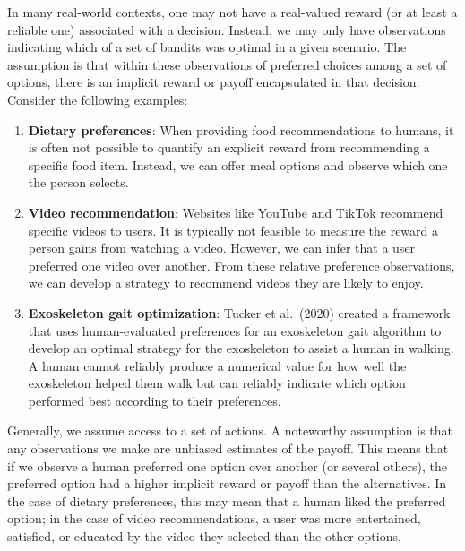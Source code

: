 \documentclass[
  letterpaper,
  numbers=noenddot,
  DIV=11]{scrreprt}
\theoremstyle{plain}
\theoremstyle{definition}
\theoremstyle{remark}
\begin{document}
In many real-world contexts, one may not have a real-valued reward (or
at least a reliable one) associated with a decision. Instead, we may
only have observations indicating which of a set of bandits was optimal
in a given scenario. The assumption is that within these observations of
preferred choices among a set of options, there is an implicit reward or
payoff encapsulated in that decision. Consider the following examples:

\begin{enumerate}
\def\labelenumi{\arabic{enumi}.}
\item
  \textbf{Dietary preferences}: When providing food recommendations to
  humans, it is often not possible to quantify an explicit reward from
  recommending a specific food item. Instead, we can offer meal options
  and observe which one the person selects.
\item
  \textbf{Video recommendation}: Websites like YouTube and TikTok
  recommend specific videos to users. It is typically not feasible to
  measure the reward a person gains from watching a video. However, we
  can infer that a user preferred one video over another. From these
  relative preference observations, we can develop a strategy to
  recommend videos they are likely to enjoy.
\item
  \textbf{Exoskeleton gait optimization}: Tucker et al.~(2020) created a
  framework that uses human-evaluated preferences for an exoskeleton
  gait algorithm to develop an optimal strategy for the exoskeleton to
  assist a human in walking. A human cannot reliably produce a numerical
  value for how well the exoskeleton helped them walk but can reliably
  indicate which option performed best according to their preferences.
\end{enumerate}

Generally, we assume access to a set of actions. A noteworthy assumption
is that any observations we make are unbiased estimates of the payoff.
This means that if we observe a human preferred one option over another
(or several others), the preferred option had a higher implicit reward
or payoff than the alternatives. In the case of dietary preferences,
this may mean that a human liked the preferred option; in the case of
video recommendations, a user was more entertained, satisfied, or
educated by the video they selected than the other options.
\end{document}
